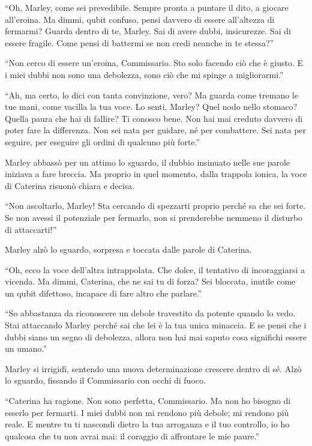 \begin{dialogue}

 \enquote{Oh, Marley, come sei prevedibile. Sempre pronta a puntare il dito, a giocare all'eroina. Ma dimmi, qubit confuso, pensi davvero di essere all’altezza di fermarmi? Guarda dentro di te, Marley. Sai di avere dubbi, insicurezze. Sai di essere fragile. Come pensi di battermi se non credi neanche in te stessa?}

 \enquote{Non cerco di essere un’eroina, Commissario. Sto solo facendo ciò che è giusto. E i miei dubbi non sono una debolezza, sono ciò che mi spinge a migliorarmi.}

 \enquote{Ah, ma certo, lo dici con tanta convinzione, vero? Ma guarda come tremano le tue mani, come vacilla la tua voce. Lo senti, Marley? Quel nodo nello stomaco? Quella paura che hai di fallire? Ti conosco bene. Non hai mai creduto davvero di poter fare la differenza. Non sei nata per guidare, né per combattere. Sei nata per seguire, per eseguire gli ordini di qualcuno più forte.}

Marley abbassò per un attimo lo sguardo, il dubbio insinuato nelle sue parole iniziava a fare breccia. Ma proprio in quel momento, dalla trappola ionica, la voce di Caterina risuonò chiara e decisa.

 \enquote{Non ascoltarlo, Marley! Sta cercando di spezzarti proprio perché sa che sei forte. Se non avessi il potenziale per fermarlo, non si prenderebbe nemmeno il disturbo di attaccarti!}

Marley alzò lo sguardo, sorpresa e toccata dalle parole di Caterina.

 \enquote{Oh, ecco la voce dell’altra intrappolata. Che dolce, il tentativo di incoraggiarsi a vicenda. Ma dimmi, Caterina, che ne sai tu di forza? Sei bloccata, inutile come un qubit difettoso, incapace di fare altro che parlare.}

 \enquote{So abbastanza da riconoscere un debole travestito da potente quando lo vedo. Stai attaccando Marley perché sai che lei è la tua unica minaccia. E se pensi che i dubbi siano un segno di debolezza, allora non hai mai saputo cosa significhi essere un umano.}

Marley si irrigidì, sentendo una nuova determinazione crescere dentro di sé. Alzò lo sguardo, fissando il Commissario con occhi di fuoco.

 \enquote{Caterina ha ragione. Non sono perfetta, Commissario. Ma non ho bisogno di esserlo per fermarti. I miei dubbi non mi rendono più debole; mi rendono più reale. E mentre tu ti nascondi dietro la tua arroganza e il tuo controllo, io ho qualcosa che tu non avrai mai: il coraggio di affrontare le mie paure.}


\end{dialogue}
